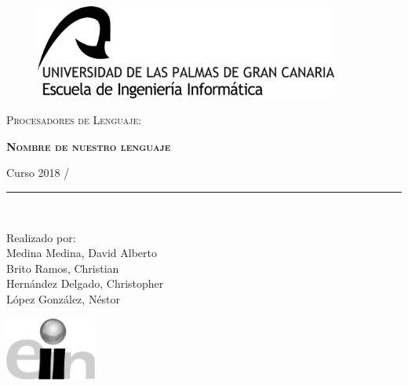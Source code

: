 \documentclass[11pt, english]{article}
\makeatletter
\newcounter{unomenos}
\gdef\@date{ Curso  2018 / \arabic{unomenos}}
\makeatother
\begin{document}
\begin{titlepage}

\begin{center}
\vspace*{-1in}
\begin{figure}[htb]
\begin{center}
\includegraphics[width=10cm]{../res/pics/logo.jpg}
\end{center}
\end{figure}

\vspace*{0.4in}
\begin{large}
\textsc{Procesadores de Lenguaje}:\\
\end{large}
\vspace*{0.2in}
\begin{Large}
\textbf{\textsc{Nombre de nuestro lenguaje}} \\
\end{Large}
\vspace*{0.3in}
\begin{large}
\@date\\
\end{large}
\vspace*{0.3in}
\rule{80mm}{0.1mm}\\
\vspace*{0.1in}
\begin{large}
Realizado por: \\

Medina Medina, David Alberto  \\
Brito Ramos, Christian  \\
Hernández Delgado, Christopher \\
López González, Néstor \\
\vspace*{0.3in}
\end{large}
\includegraphics[width=3cm]{../res/pics/LogoEscuela.jpg}
\end{center}
\end{titlepage}
\end{document}
